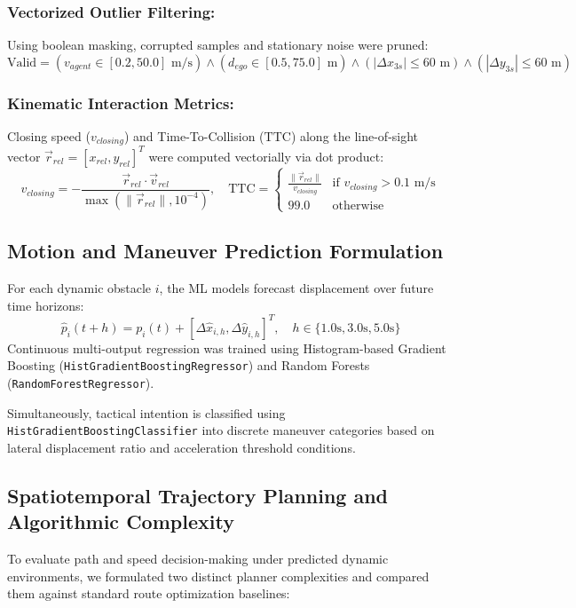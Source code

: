 \documentclass[runningheads]{llncs}
\begin{document}
\subsubsection{Vectorized Outlier Filtering:}
Using boolean masking, corrupted samples and stationary noise were pruned:
\begin{equation}
\text{Valid} = (v_{agent} \in [0.2, 50.0] \text{ m/s}) \land (d_{ego} \in [0.5, 75.0] \text{ m}) \land (|\Delta x_{3s}| \le 60 \text{ m}) \land (|\Delta y_{3s}| \le 60 \text{ m})
\end{equation}

\subsubsection{Kinematic Interaction Metrics:}
Closing speed ($v_{closing}$) and Time-To-Collision ($\text{TTC}$) along the line-of-sight vector $\vec{r}_{rel} = [x_{rel}, y_{rel}]^T$ were computed vectorially via dot product:
\begin{equation}
v_{closing} = -\frac{\vec{r}_{rel} \cdot \vec{v}_{rel}}{\max(\|\vec{r}_{rel}\|, 10^{-4})}, \quad \text{TTC} = \begin{cases} 
\frac{\|\vec{r}_{rel}\|}{v_{closing}} & \text{if } v_{closing} > 0.1 \text{ m/s} \\ 
99.0 & \text{otherwise} 
\end{cases}
\end{equation}

\subsection{Motion and Maneuver Prediction Formulation}
For each dynamic obstacle $i$, the ML models forecast displacement over future time horizons:
\begin{equation}
\hat{p}_i(t + h) = p_i(t) + [\Delta \hat{x}_{i,h}, \Delta \hat{y}_{i,h}]^T, \quad h \in \{1.0\text{s}, 3.0\text{s}, 5.0\text{s}\}
\end{equation}
Continuous multi-output regression was trained using Histogram-based Gradient Boosting (\texttt{HistGradientBoostingRegressor}) and Random Forests (\texttt{RandomForestRegressor}). 

Simultaneously, tactical intention is classified using \texttt{HistGradientBoostingClassifier} into discrete maneuver categories based on lateral displacement ratio and acceleration threshold conditions.

\subsection{Spatiotemporal Trajectory Planning and Algorithmic Complexity}
To evaluate path and speed decision-making under predicted dynamic environments, we formulated two distinct planner complexities and compared them against standard route optimization baselines:
\end{document}
